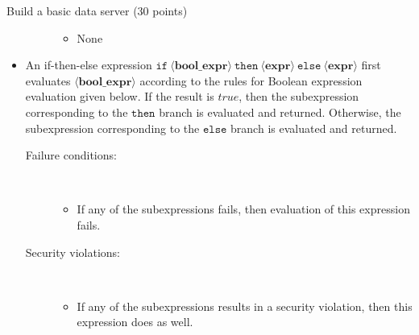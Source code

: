 \documentclass[11pt]{article}
\newcommand{\true}{\ensuremath{\mathit{true}}\xspace}
\begin{document}
\begin{problem}{Build a basic data server (30 points)}
\begin{itemize}
\begin{description}
\begin{itemize}
\item None
\end{itemize}
\end{description}
\item An if-then-else expression $\mathtt{if}\ \langle\mathbf{bool\_expr}\rangle\ \mathtt{then}\ \langle\mathbf{expr}\rangle\ \mathtt{else}\ \langle\mathbf{expr}\rangle$ first evaluates $\langle\mathbf{bool\_expr}\rangle$ according to the rules for Boolean expression evaluation given below. If the result is \true, then the subexpression corresponding to the $\mathtt{then}$ branch is evaluated and returned. Otherwise, the subexpression corresponding to the $\mathtt{else}$ branch is evaluated and returned.
\begin{description}
\item[Failure conditions:]\ \\[-1.5em]
\begin{itemize}
\item If any of the subexpressions fails, then evaluation of this expression fails.
\end{itemize}
\item[Security violations:]\ \\[-1.5em]
\begin{itemize}
\item If any of the subexpressions results in a security violation, then this expression does as well.
\end{itemize}
\end{description}
\end{itemize}


\end{problem}
\end{document}
